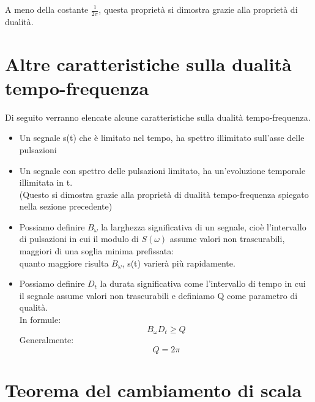 A meno della costante $\frac{1}{2 \pi}$, questa proprietà si dimostra grazie alla proprietà di dualità. \newline 

\newpage 

\section{Altre caratteristiche sulla dualità tempo-frequenza} 

Di seguito verranno elencate alcune caratteristiche sulla dualità tempo-frequenza. \newline 

{
    \begin{itemize}
        \item Un segnale s(t) che è limitato nel tempo, ha spettro illimitato sull'asse delle pulsazioni 
        \item Un segnale con spettro delle pulsazioni limitato, ha un'evoluzione temporale illimitata in t. \\ 
        (Questo si dimostra grazie alla proprietà di dualità tempo-frequenza spiegato nella sezione precedente) 
        \item Possiamo definire $B_\omega$ la larghezza significativa di un segnale, cioè l'intervallo di pulsazioni in cui il modulo di $S(\omega)$ assume valori non trascurabili, maggiori di una soglia minima prefissata: \\ 
        quanto maggiore risulta $B_\omega$, s(t) varierà più rapidamente. 
        \item Possiamo definire $D_t$ la durata significativa come l'intervallo di tempo in cui il segnale assume valori non trascurabili e definiamo Q come parametro di qualità. \\
        In formule: 
        {
            \Large 
            \begin{equation}
                B_\omega D_t \geq Q
            \end{equation}
        } 
        Generalmente: 
        {
            \Large 
            \begin{equation}
                Q = 2\pi
            \end{equation}
        } 
        
    \end{itemize}
}


\newpage 

\section{Teorema del cambiamento di scala} 

